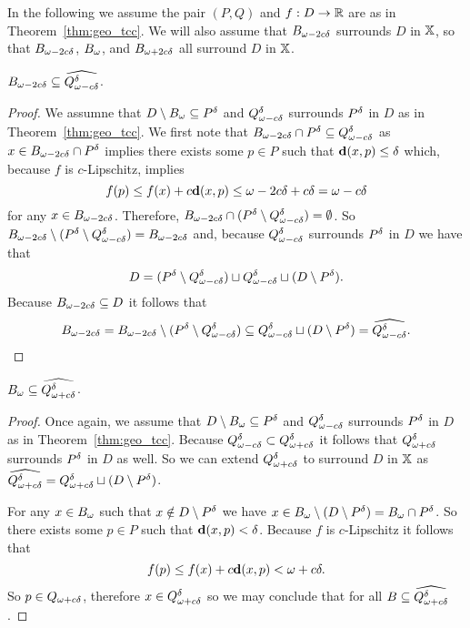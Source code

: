 
In the following we assume the pair $(P, Q)$ and $f : D\to\R$ are as in Theorem~\ref{thm:geo_tcc}.
We will also assume that $\b$ surrounds $D$ in $\X$, so that $\b$, $\B$, and $\BB$ all surround $D$ in $\X$.

\begin{lemma}
  $\b\subseteq \ext{\Q^\of}$.
\end{lemma}
\begin{proof}
  We assumne that $D\setminus \B\subseteq \P$ and $\Q^\of$ surrounds $\P$ in $D$ as in Theorem~\ref{thm:geo_tcc}.
  We first note that $\b\cap \P\subseteq \Q^\of$ as $x\in \b\cap \P$ implies there exists some $p\in P$ such that $\dist(x, p)\leq \of$ which, because $f$ is $c$-Lipschitz, implies
  \[ f(p) \leq f(x) + c\dist(x, p)\leq \o + c\delta = \fen\]
  for any $x\in \b$.
  Therefore, $\b\cap (\P\setminus \Q^\of) = \emptyset$.
  So $\b\setminus (\P\setminus \Q^\of) = \b$ and, because $\Q^\of$ surrounds $\P$ in $D$ we have that
  \[ D = (\P\setminus \Q^\of)\sqcup \Q^\of \sqcup (D\setminus \P).\]
  Because $\b\subseteq D$ it follows that
  \[ \b = \b \setminus (\P\setminus \Q^\of)\subseteq \Q^\of\sqcup (D\setminus \P) = \ext{\Q^\of}. \]
\end{proof}

\begin{lemma}
  $\B\subseteq \ext{\QQ^\of}$.
\end{lemma}
\begin{proof}
  Once again, we assume that $D\setminus \B\subseteq \P$ and $\Q^\of$ surrounds $\P$ in $D$ as in Theorem~\ref{thm:geo_tcc}.
  Because $\Q^\of \subset \QQ^\of$ it follows that $\QQ^\of$ surrounds $\P$ in $D$ as well.
  So we can extend $\QQ^\of$ to surround $D$ in $\X$ as $\ext{\QQ^\of} = \QQ^\of\sqcup (D\setminus\P)$.

  For any $x\in \B$ such that $x\notin D\setminus\P$ we have $x\in \B\setminus (D\setminus \P) = \B\cap \P$.
  So there exists some $p\in P$ such that $\dist(x, p) < \delta$.
  Because $f$ is $c$-Lipschitz it follows that
  \[ f(p)\leq f(x) + c\dist(x, p) < \omega + c\delta. \]
  So $p\in \QQ$, therefore $x\in \QQ^\delta$ so we may conclude that for all $B\subseteq \ext{\QQ^\delta}$.
\end{proof}


